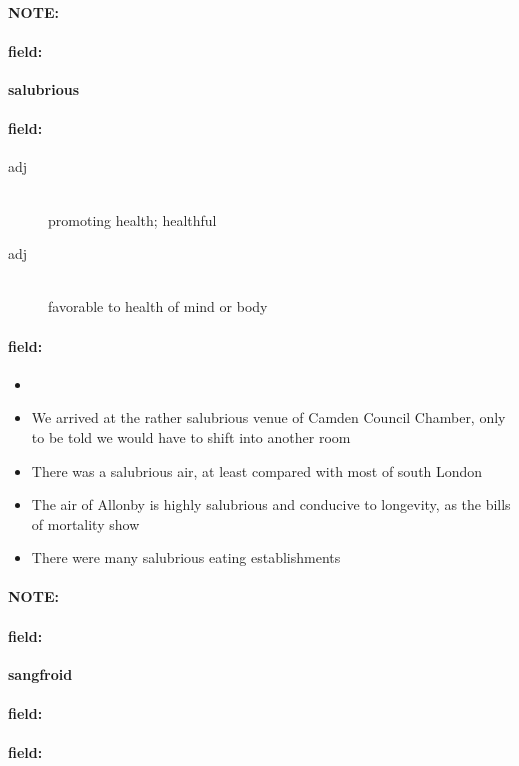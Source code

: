 \documentclass[12pt]{article}
\newenvironment{note}{\paragraph{NOTE:}}{}
\newenvironment{field}{\paragraph{field:}}{}
\begin{document}
\begin{note}
\begin{field}
\textbf{\large salubrious}
\end{field}


\begin{field}
\begin{description}
\item[adj] \hfill \\ 
promoting health; healthful

\item[adj] \hfill \\ 
favorable to health of mind or body

\end{description}
\end{field}

\begin{field}
\begin{itemize}
\item 
\item We arrived at the rather salubrious venue of Camden Council Chamber, only to be told we would have to shift into another room
\item There was a salubrious air, at least compared with most of south London
\item The air of Allonby is highly salubrious and conducive to longevity, as the bills of mortality show
\item There were many salubrious eating establishments
\end{itemize}
\end{field}
\end{note}
\begin{note}
\begin{field}
\textbf{\large sangfroid}
\end{field}


\begin{field}
\end{field}

\begin{field}
\end{field}
\end{note}
\end{document}
